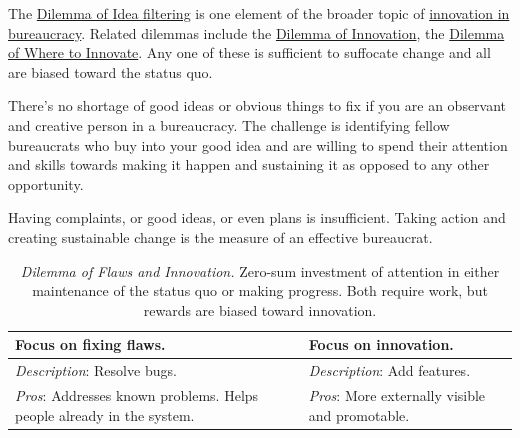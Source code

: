 The \hyperref[table:dilemma-personal-idea-filtering]{Dilemma of Idea filtering} is one element of the broader topic of \hyperref[sec:innovation]{innovation in bureaucracy}. 
Related dilemmas include the \hyperref[table:dilemma-personal-disruptive-or-iterative]{Dilemma of Innovation}, the \hyperref[table:dilemma-personal-where-to-innovate]{Dilemma of Where to Innovate}. Any one of these is sufficient to suffocate change and all are biased toward the status quo.  

There's no shortage of good ideas or obvious things to fix if you are an observant and creative person in a bureaucracy.
The challenge is identifying fellow bureaucrats who buy into your good idea and are willing to spend their attention and skills towards making it happen and sustaining it as opposed to any other opportunity.

Having complaints, or good ideas, or even plans is insufficient. Taking action and creating sustainable change is the measure of an effective bureaucrat.



\begin{center}
\begin{table}[H] %
\begin{tabular}{ | m{\dilemmatablewidth}| m{\dilemmatablewidth} | } 
  \hline
  \textbf{Focus on fixing flaws.} &
  \textbf{Focus on innovation.} \\
  \hline
  \textit{Description}: Resolve bugs. &
  \textit{Description}: Add features. \\
  \hline
  \textit{Pros}: Addresses known problems. Helps people already in the system.  & 
  \textit{Pros}: More externally visible and promotable. \\
  \hline
\end{tabular}
\caption{
\textit{Dilemma of Flaws and Innovation.}
Zero-sum investment of attention in either maintenance of the status quo or making progress. Both require work, but rewards are biased toward innovation. 
}
\label{table:dilemma-personal-flaws-and-innovation}
\end{table}
\end{center}

